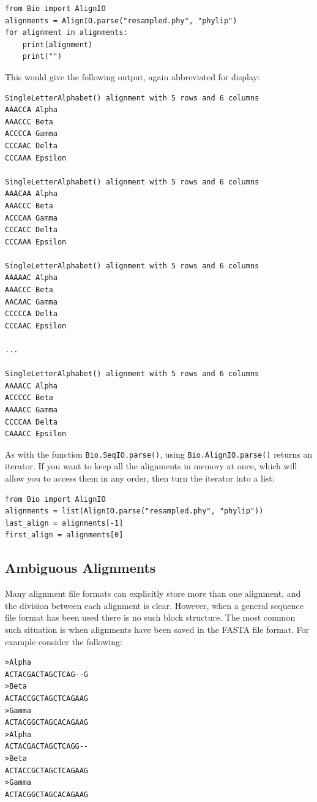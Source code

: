\documentclass{report}
\begin{document}
\begin{verbatim}
from Bio import AlignIO
alignments = AlignIO.parse("resampled.phy", "phylip")
for alignment in alignments:
    print(alignment)
    print("")
\end{verbatim}

\noindent This would give the following output, again abbreviated for display:

\begin{verbatim}
SingleLetterAlphabet() alignment with 5 rows and 6 columns
AAACCA Alpha
AAACCC Beta
ACCCCA Gamma
CCCAAC Delta
CCCAAA Epsilon

SingleLetterAlphabet() alignment with 5 rows and 6 columns
AAACAA Alpha
AAACCC Beta
ACCCAA Gamma
CCCACC Delta
CCCAAA Epsilon

SingleLetterAlphabet() alignment with 5 rows and 6 columns
AAAAAC Alpha
AAACCC Beta
AACAAC Gamma
CCCCCA Delta
CCCAAC Epsilon

...

SingleLetterAlphabet() alignment with 5 rows and 6 columns
AAAACC Alpha
ACCCCC Beta
AAAACC Gamma
CCCCAA Delta
CAAACC Epsilon
\end{verbatim}

As with the function \verb|Bio.SeqIO.parse()|, using \verb|Bio.AlignIO.parse()| returns an iterator.
If you want to keep all the alignments in memory at once, which will allow you to access them in any order, then turn the iterator into a list:

\begin{verbatim}
from Bio import AlignIO
alignments = list(AlignIO.parse("resampled.phy", "phylip"))
last_align = alignments[-1]
first_align = alignments[0]
\end{verbatim}

\subsection{Ambiguous Alignments}
\label{sec:AlignIO-count-argument}
Many alignment file formats can explicitly store more than one alignment, and the division between each alignment is clear.  However, when a general sequence file format has been used there is no such block structure.  The most common such situation is when alignments have been saved in the FASTA file format.  For example consider the following:

\begin{verbatim}
>Alpha
ACTACGACTAGCTCAG--G
>Beta
ACTACCGCTAGCTCAGAAG
>Gamma
ACTACGGCTAGCACAGAAG
>Alpha
ACTACGACTAGCTCAGG--
>Beta
ACTACCGCTAGCTCAGAAG
>Gamma
ACTACGGCTAGCACAGAAG
\end{verbatim}
\end{document}
